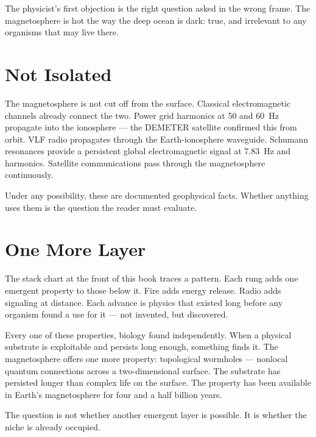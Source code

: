 The physicist's first objection is the right question asked in the wrong frame. The magnetosphere is hot the way the deep ocean is dark: true, and irrelevant to any organisms that may live there.

\section*{Not Isolated}
\label{spine:ws-not-isolated}

The magnetosphere is not cut off from the surface. Classical electromagnetic channels already connect the two. Power grid harmonics at 50 and 60~Hz propagate into the ionosphere --- the DEMETER satellite confirmed this from orbit. VLF radio propagates through the Earth-ionosphere waveguide. Schumann resonances provide a persistent global electromagnetic signal at 7.83~Hz and harmonics. Satellite communications pass through the magnetosphere continuously.

Under any possibility, these are documented geophysical facts. Whether anything uses them is the question the reader must evaluate.

\section*{One More Layer}
\label{spine:ws-one-more-layer}

The stack chart at the front of this book traces a pattern. Each rung adds one emergent property to those below it. Fire adds energy release. Radio adds signaling at distance. Each advance is physics that existed long before any organism found a use for it --- not invented, but discovered.

Every one of these properties, biology found independently. When a physical substrate is exploitable and persists long enough, something finds it. The magnetosphere offers one more property: topological wormholes --- nonlocal quantum connections across a two-dimensional surface. The substrate has persisted longer than complex life on the surface. The property has been available in Earth's magnetosphere for four and a half billion years.

The question is not whether another emergent layer is possible. It is whether the niche is already occupied.


